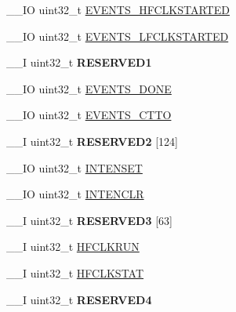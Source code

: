 \begin{DoxyCompactItemize}
\item 
\+\_\+\+\_\+\+I\+O uint32\+\_\+t \hyperlink{struct_n_r_f___c_l_o_c_k___type_a2073af32a7f86e24c9477a0031f30ac6}{E\+V\+E\+N\+T\+S\+\_\+\+H\+F\+C\+L\+K\+S\+T\+A\+R\+T\+E\+D}
\item 
\+\_\+\+\_\+\+I\+O uint32\+\_\+t \hyperlink{struct_n_r_f___c_l_o_c_k___type_a9121f191427de834454aa3d7cce541b1}{E\+V\+E\+N\+T\+S\+\_\+\+L\+F\+C\+L\+K\+S\+T\+A\+R\+T\+E\+D}
\item 
\hypertarget{struct_n_r_f___c_l_o_c_k___type_adc18efb82af5a984200e8917023a58b1}{}\+\_\+\+\_\+\+I uint32\+\_\+t {\bfseries R\+E\+S\+E\+R\+V\+E\+D1}\label{struct_n_r_f___c_l_o_c_k___type_adc18efb82af5a984200e8917023a58b1}

\item 
\+\_\+\+\_\+\+I\+O uint32\+\_\+t \hyperlink{struct_n_r_f___c_l_o_c_k___type_a87d08d13ac21c326ab9318e7f3c349fa}{E\+V\+E\+N\+T\+S\+\_\+\+D\+O\+N\+E}
\item 
\+\_\+\+\_\+\+I\+O uint32\+\_\+t \hyperlink{struct_n_r_f___c_l_o_c_k___type_adcf77f317aefbf614289e3791c8e9623}{E\+V\+E\+N\+T\+S\+\_\+\+C\+T\+T\+O}
\item 
\hypertarget{struct_n_r_f___c_l_o_c_k___type_a27108befaf12231f4c6bb2eeef97323e}{}\+\_\+\+\_\+\+I uint32\+\_\+t {\bfseries R\+E\+S\+E\+R\+V\+E\+D2} \mbox{[}124\mbox{]}\label{struct_n_r_f___c_l_o_c_k___type_a27108befaf12231f4c6bb2eeef97323e}

\item 
\+\_\+\+\_\+\+I\+O uint32\+\_\+t \hyperlink{struct_n_r_f___c_l_o_c_k___type_aa5cdddb591bc33260f1da18c40acecbe}{I\+N\+T\+E\+N\+S\+E\+T}
\item 
\+\_\+\+\_\+\+I\+O uint32\+\_\+t \hyperlink{struct_n_r_f___c_l_o_c_k___type_ae6b1609fdb5f54fdd52591f94fde41b7}{I\+N\+T\+E\+N\+C\+L\+R}
\item 
\hypertarget{struct_n_r_f___c_l_o_c_k___type_a43a8f468e57d1c8b4eb483ba74a757ed}{}\+\_\+\+\_\+\+I uint32\+\_\+t {\bfseries R\+E\+S\+E\+R\+V\+E\+D3} \mbox{[}63\mbox{]}\label{struct_n_r_f___c_l_o_c_k___type_a43a8f468e57d1c8b4eb483ba74a757ed}

\item 
\+\_\+\+\_\+\+I uint32\+\_\+t \hyperlink{struct_n_r_f___c_l_o_c_k___type_aef7e247081699e1a6d0cd28129147e26}{H\+F\+C\+L\+K\+R\+U\+N}
\item 
\+\_\+\+\_\+\+I uint32\+\_\+t \hyperlink{struct_n_r_f___c_l_o_c_k___type_ae4230e802c2deff4632f6ab027845c7c}{H\+F\+C\+L\+K\+S\+T\+A\+T}
\item 
\hypertarget{struct_n_r_f___c_l_o_c_k___type_aada1f525471df914fbe836285e503f07}{}\+\_\+\+\_\+\+I uint32\+\_\+t {\bfseries R\+E\+S\+E\+R\+V\+E\+D4}\label{struct_n_r_f___c_l_o_c_k___type_aada1f525471df914fbe836285e503f07}


\end{DoxyCompactItemize}

